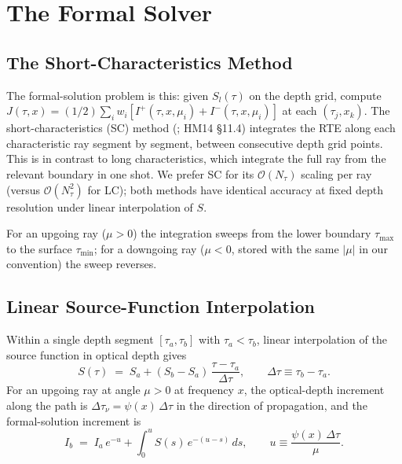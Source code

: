 \documentclass[11pt]{article}
\begin{document}
\section{The Formal Solver}
\label{sec:formal-solver}

\subsection{The Short-Characteristics Method}

The formal-solution problem is this: given $S_l(\tau)$ on the depth
grid, compute $J(\tau, x) = (1/2) \sum_i w_i [I^+(\tau, x, \mu_i) +
I^-(\tau, x, \mu_i)]$ at each $(\tau_j, x_k)$.  The short-characteristics
(SC) method (\citep{Olson1987}; HM14 §11.4) integrates the RTE along
each characteristic ray segment by segment, between consecutive depth
grid points.  This is in contrast to long characteristics, which
integrate the full ray from the relevant boundary in one shot.  We
prefer SC for its $\mathcal{O}(N_\tau)$ scaling per ray (versus
$\mathcal{O}(N_\tau^2)$ for LC); both methods have identical accuracy
at fixed depth resolution under linear interpolation of $S$.

For an upgoing ray ($\mu > 0$) the integration sweeps from the lower
boundary $\tau_{\max}$ to the surface $\tau_{\min}$; for a downgoing
ray ($\mu < 0$, stored with the same $|\mu|$ in our convention) the
sweep reverses.

\subsection{Linear Source-Function Interpolation}

Within a single depth segment $[\tau_a, \tau_b]$ with $\tau_a < \tau_b$,
linear interpolation of the source function in optical depth gives
\begin{equation}
S(\tau) \;=\; S_a + (S_b - S_a)\,\frac{\tau - \tau_a}{\Delta\tau},
\qquad \Delta\tau \equiv \tau_b - \tau_a.
\end{equation}
For an upgoing ray at angle $\mu > 0$ at frequency $x$, the optical-depth
increment along the path is $\Delta\tau_\nu = \psi(x)\,\Delta\tau$ in the
direction of propagation, and the formal-solution increment is
\begin{equation}
I_b \;=\; I_a\, e^{-u} + \int_0^{u}\!\!S(s)\, e^{-(u-s)}\,ds,
\qquad u \equiv \frac{\psi(x)\,\Delta\tau}{\mu} .
\label{eq:sc-integral}
\end{equation}
\end{document}
